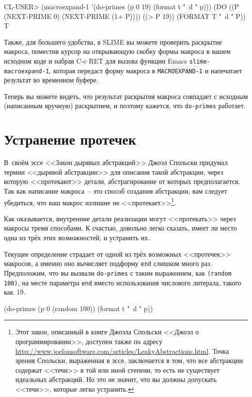 \begin{myverb}
CL-USER> (macroexpand-1 '(do-primes (p 0 19) (format t "~d " p)))
(DO ((P (NEXT-PRIME 0) (NEXT-PRIME (1+ P))))
    ((> P 19))
  (FORMAT T "~d " P))
T
\end{myverb}

Также, для большего удобства, в SLIME вы можете проверить раскрытие макроса, поместив
курсор на открывающую скобку формы макроса в вашем исходном коде и набрав C-c RET для
вызова функции Emacs \lstinline{slime-macroexpand-1}, которая передаст форму макроса в
\lstinline{MACROEXPAND-1} и напечатает результат во временном буфере.

Теперь вы можете видеть, что результат раскрытия макроса совпадает с исходным (написанным
вручную) раскрытием, и поэтому кажется, что \lstinline{do-primes} работает.

\section{Устранение протечек}

В~своём эссе <<Закон дырявых абстракций>> Джоэл Спольски придумал термин <<дырявой
абстракции>> для описания такой абстракции, через которую <<протекают>> детали,
абстрагирование от которых предполагается. Так как написание макроса~-- это способ
создания абстракции, вам следует убедиться, что ваш макрос излишне не
<<протекает>>\footnote{Этот закон, описанный в книге Джоэла Спольски <<Джоэл о
  программировании>>, доступен также по адресу
  \url{http://www.joelonsoftware.com/articles/LeakyAbstractions.html}. Точка зрения
  Спольски, выраженная в эссе, заключается в том, что все абстракции содержат <<течи>> в той
  или иной степени, то есть не существует идеальных абстракций. Но это не значит, что вы
  должны допускать <<течи>>, которые легко устранить.}.

Как оказывается, внутренние детали реализации могут <<протекать>> через макросы тремя
способами. К счастью, довольно легко сказать, имеет ли место одна из трёх этих
возможностей, и устранить их.

Текущее определение страдает от одной из трёх возможных <<протечек>> макросов, а именно оно
вычисляет подформу \lstinline{end} слишком много раз. Предположим, что вы вызвали
\lstinline{do-primes} с таким выражением, как \lstinline{(random 100)}, на месте параметра
\lstinline{end} вместо использования числового литерала, такого как~19.

\begin{myverb}
(do-primes (p 0 (random 100))
  (format t "~d " p))
\end{myverb}

